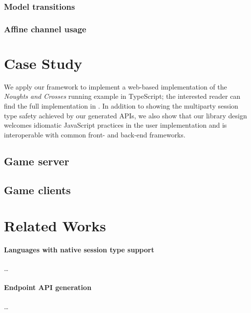 \documentclass[submission,copyright,creativecommons]{eptcs}
\begin{document}
\subsubsection{Model transitions}

\subsubsection{Affine channel usage}

\section{Case Study}
\label{section:example}
We apply our framework to implement a web-based implementation of the \textit{Noughts and Crosses} running example in TypeScript; the interested reader can find the full implementation in \cite{NoughtsAndCrosses}. In addition to showing the multiparty session type safety achieved by our generated APIs, we also show that our library design welcomes idiomatic JavaScript practices in the user implementation and is interoperable with common front- and back-end frameworks.
 
\subsection{Game server}
\label{section:exampleserver}


\subsection{Game clients}

\section{Related Works}
\paragraph{Languages with native session type support} \dots

\paragraph{Endpoint API generation} \dots
\end{document}
